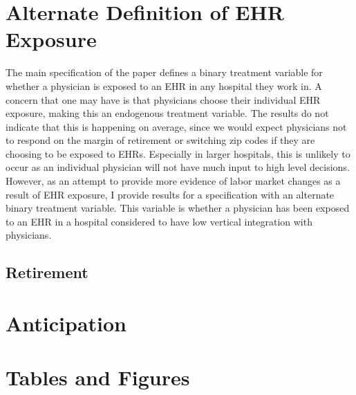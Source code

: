 \documentclass[11pt]{article}
\begin{document}
\appendix

\section{Alternate Definition of EHR Exposure}

The main specification of the paper defines a binary treatment variable for whether a physician is exposed to an EHR in any hospital they work in. A concern that one may have is that physicians choose their individual EHR exposure, making this an endogenous treatment variable. The results do not indicate that this is happening on average, since we would expect physicians not to respond on the margin of retirement or switching zip codes if they are choosing to be exposed to EHRs. Especially in larger hospitals, this is unlikely to occur as an individual physician will not have much input to high level decisions. However, as an attempt to provide more evidence of labor market changes as a result of EHR exposure, I provide results for a specification with an alternate binary treatment variable. This variable is whether a physician has been exposed to an EHR in a hospital considered to have low vertical integration with physicians. 

\subsection{Retirement}

\section{Anticipation}


\clearpage

\section{Tables and Figures}
\end{document}
